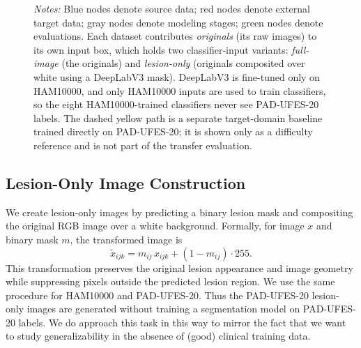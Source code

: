 \documentclass[10pt]{article}
\begin{document}
\begin{figure}[t]

    \vspace{4pt}
    \begin{minipage}{\linewidth}
        \footnotesize \emph{Notes:} Blue nodes denote source data; red nodes denote external target data; gray nodes denote modeling stages; green nodes denote evaluations. Each dataset contributes \emph{originals} (its raw images) to its own input box, which holds two classifier-input variants: \emph{full-image} (the originals) and \emph{lesion-only} (originals composited over white using a DeepLabV3 mask). DeepLabV3 is fine-tuned only on HAM10000, and only HAM10000 inputs are used to train classifiers, so the eight HAM10000-trained classifiers never see PAD-UFES-20 labels. The dashed yellow path is a separate target-domain baseline trained directly on PAD-UFES-20; it is shown only as a difficulty reference and is not part of the transfer evaluation.
    \end{minipage}
\end{figure}

\subsection{Lesion-Only Image Construction}

We create lesion-only images by predicting a binary lesion mask and compositing the original RGB image over a white background. Formally, for image $x$ and binary mask $m$, the transformed image is
\[
    \tilde{x}_{ijk} = m_{ij}\, x_{ijk} + (1-m_{ij}) \cdot 255.
\]
This transformation preserves the original lesion appearance and image geometry while suppressing pixels outside the predicted lesion region. We use the same procedure for HAM10000 and PAD-UFES-20. Thus the PAD-UFES-20 lesion-only images are generated without training a segmentation model on PAD-UFES-20 labels. We do approach this task in this way to mirror the fact that we want to study generalizability in the absence of (good) clinical training data.
\end{document}
